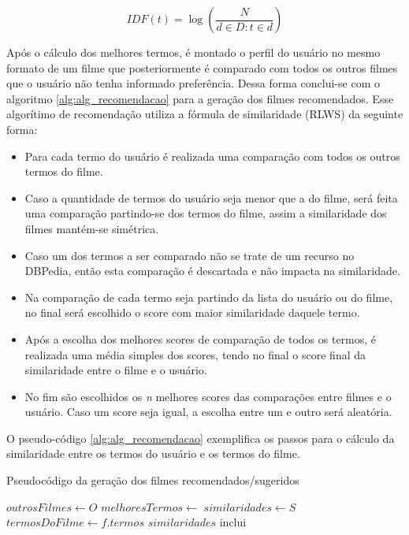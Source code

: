 \begin{equation}
	IDF(t) = \log (\frac{N}{d \in D : t \in d})
\label{eq:idf}
\end{equation}

Após o cálculo dos melhores termos, é montado o perfil do usuário no mesmo formato de um filme que posteriormente é comparado com todos os outros filmes que o usuário não tenha informado preferência. Dessa forma conclui-se com o algoritmo \ref{alg:alg_recomendacao} para a geração dos filmes recomendados. Esse algorítimo de recomendação utiliza a fórmula de similaridade (\ac{RLWS}) da seguinte forma:

\begin{itemize}
	\item{Para cada termo do usuário é realizada uma comparação com todos os outros termos do filme.}
	\item{Caso a quantidade de termos do usuário seja menor que a do filme, será feita uma comparação partindo-se dos termos do filme, assim a similaridade dos filmes mantém-se simétrica.}
	\item{Caso um dos termos a ser comparado não se trate de um recurso no DBPedia, então esta comparação é descartada e não impacta na similaridade.}
	\item{Na comparação de cada termo seja partindo da lista do usuário ou do filme, no final será escolhido o score com maior similaridade daquele termo.}
	\item{Após a escolha dos melhores scores de comparação de todos os termos, é realizada uma média simples dos scores, tendo no final o score final da similaridade entre o filme e o usuário.}
	\item{No fim são escolhidos os \textit{n} melhores scores das comparações entre filmes e o usuário. Caso um score seja igual, a escolha entre um e outro será aleatória.}
\end{itemize}

O pseudo-código \ref{alg:alg_recomendacao} exemplifica os passos para o cálculo da similaridade entre os termos do usuário e os termos do filme.

\begin{algorithm}
	\caption{Pseudocódigo da geração dos filmes recomendados/sugeridos}
    \begin{algorithmic}[1]
        	\State  $outrosFilmes\gets O$
        	\State $melhoresTermos\gets$ 
        	\State $similaridades\gets S$
        		\State $termosDoFilme\gets f.termos$
        		\State $similaridades$ {inclui} 
        	\EndFor
        \EndFunction
    \end{algorithmic}
    \label{alg:alg_recomendacao}
\end{algorithm}

